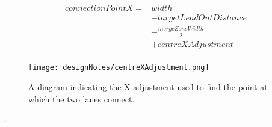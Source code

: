 \begin{equation}\label{connectionPointX}
	\begin{split}
connectionPointX = & width \\
				   & - targetLeadOutDistance \\
				   & - \frac{mergeZoneWidth}{2} \\
				   & + centreXAdjustment \\
	\end{split}
\end{equation}

\begin{figure}[htb]
\centering
\texttt{[image: designNotes/centreXAdjustment.png]}
\caption{A diagram indicating the X-adjustment used to find the point at which the two lanes connect.}
\label{fig:centreXAdjustment}
\end{figure}.